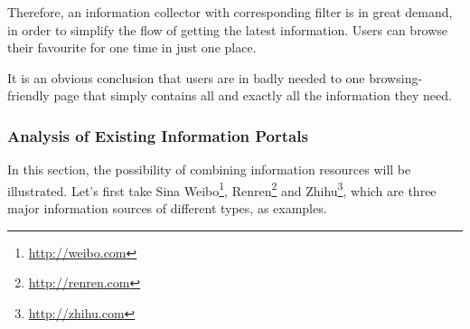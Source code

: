    Therefore, an information collector with corresponding filter is in great demand,
   in order to simplify the flow of getting the latest information.
   Users can browse their favourite for one time in just one place.

   It is an obvious conclusion that users are in badly needed to one browsing-friendly
   page that simply contains all and exactly all the information they need.

\subsubsection{Analysis of Existing Information Portals}
In this section, the possibility of combining information resources will be illustrated.
Let’s first take Sina Weibo\footnote{\url{http://weibo.com}}, Renren\footnote{\url{http://renren.com}} and
Zhihu\footnote{\url{http://zhihu.com}}, which are three major information sources of different types,
as examples.

